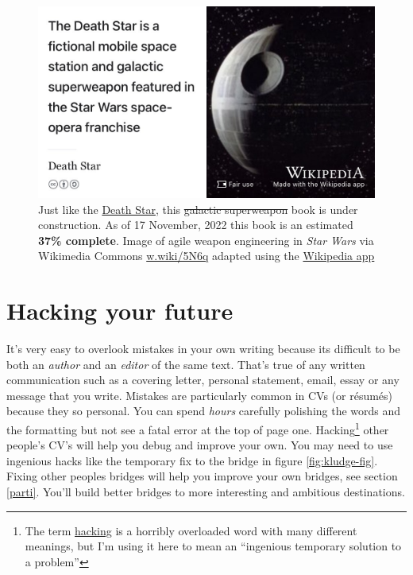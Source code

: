 \documentclass[
]{book}
\begin{document}
\begin{figure}

{\centering \includegraphics[width=0.99\linewidth]{images/DeathStar2} 

}

\caption{Just like the \href{https://en.wikipedia.org/wiki/Death_Star}{Death Star}, this \sout{galactic superweapon} book is under construction. As of 17 November, 2022 this book is an estimated \textbf{37\% complete}. Image of agile weapon engineering in \emph{Star Wars} via Wikimedia Commons \href{https://w.wiki/5N6q}{w.wiki/5N6q} adapted using the \href{https://apps.apple.com/gb/app/wikipedia/id324715238}{Wikipedia app}}\label{fig:deathstar19-fig}
\end{figure}

\hypertarget{hacking}{%
\chapter{Hacking your future}\label{hacking}}

It's very easy to overlook mistakes in your own writing because its difficult to be both an \emph{author} and an \emph{editor} of the same text. That's true of any written communication such as a covering letter, personal statement, email, essay or any message that you write. Mistakes are particularly common in CVs (or résumés) because they so personal. You can spend \emph{hours} carefully polishing the words and the formatting but not see a fatal error at the top of page one. Hacking\footnote{The term \href{https://en.wikipedia.org/wiki/Hacker_(disambiguation)}{hacking} is a horribly overloaded word with many different meanings, but I'm using it here to mean an ``ingenious temporary solution to a problem''} other people's CV's will help you debug and improve your own. You may need to use ingenious hacks like the temporary fix to the bridge in figure \ref{fig:kludge-fig}. Fixing other peoples bridges will help you improve your own bridges, see section \ref{parti}. You'll build better bridges to more interesting and ambitious destinations.
\end{document}
